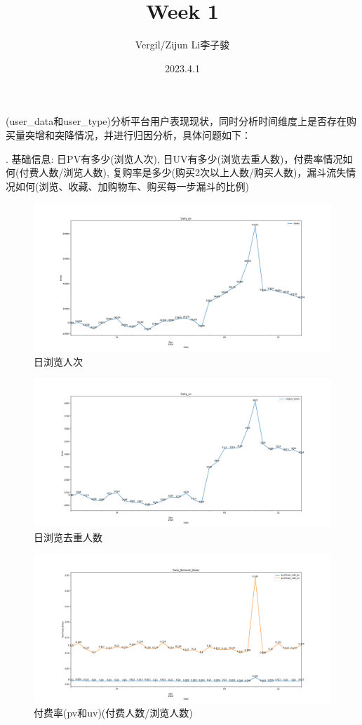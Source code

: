 \documentclass[a4paper]{article}
\author{Vergil/Zijun Li李子骏}
\title{Week 1}
\date{2023.4.1}
\begin{document}
\maketitle
{}(user\_data和user\_type)分析平台用户表现现状，同时分析时间维度上是否存在购买量突增和突降情况，并进行归因分析，具体问题如下：

. 基础信息: 日PV有多少(浏览人次), 日UV有多少(浏览去重人数)，付费率情况如何(付费人数/浏览人数), 复购率是多少(购买2次以上人数/购买人数)，漏斗流失情况如何(浏览、收藏、加购物车、购买每一步漏斗的比例)

\begin{figure}[H]
	\centering
	\includegraphics[width=1\textwidth]{./daily_pv.pdf}
	\caption{日浏览人次}
	\label{Fig.Daily_view}
\end{figure}

\begin{figure}[H]
	\centering
	\includegraphics[width=1\textwidth]{./daily_uv.pdf}
	\caption{日浏览去重人数}
	\label{Fig.Daily_unique_view}
\end{figure}

\begin{figure}[H]
	\centering
	\includegraphics[width=1\textwidth]{./purchase_rate.pdf}
	\caption{付费率(pv和uv)(付费人数/浏览人数)}
	\label{Fig.purchase_rate}
\end{figure}
\end{document}
